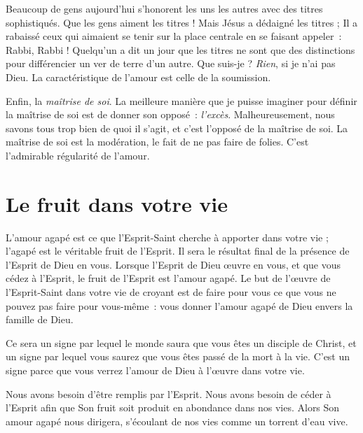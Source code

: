 Beaucoup de gens aujourd'hui s'honorent les uns les autres
 avec des titres sophistiqués. Que les gens aiment les titres !
 Mais Jésus a dédaigné les titres ; Il a rabaissé ceux qui aimaient
 se tenir sur la place centrale en se faisant appeler~:
 \og Rabbi, Rabbi ! \fg{}
 Quelqu'un a dit un jour que les titres ne sont que des distinctions
 pour différencier un ver de terre d'un autre. Que suis-je ?
 \emph{Rien}, si je n'ai pas Dieu. La caractéristique de l'amour
 est celle de la soumission.

Enfin, la \emph{maîtrise de soi}. La meilleure manière que je puisse imaginer
 pour définir la maîtrise de soi est de donner son opposé~: \emph{l'excès}.
 Malheureusement, nous savons tous trop bien de quoi il s'agit,
 et c'est l'opposé de la maîtrise de soi.
 La maîtrise de soi est la modération, le fait de ne pas faire de folies.
 C'est l'admirable régularité de l'amour.


\section*{Le fruit dans votre vie}

L'amour agapé est ce que l'Esprit-Saint cherche à apporter dans votre vie ;
 l'agapé est le véritable fruit de l'Esprit.
 Il sera le résultat final de la présence de l'Esprit de Dieu en vous.
 Lorsque l'Esprit de Dieu œuvre en vous, et que vous cédez à l'Esprit,
 le fruit de l'Esprit est l'amour agapé. Le but de l'œuvre de
 l'Esprit-Saint dans votre vie de croyant est de faire pour vous
 ce que vous ne pouvez pas faire pour vous-même~:
 vous donner l'amour agapé de Dieu envers la famille de Dieu.

Ce sera un signe par lequel le monde saura que vous êtes un disciple
 de Christ, et un signe par lequel vous saurez que vous êtes passé
 de la mort à la vie. C'est un signe parce que vous verrez
 l'amour de Dieu à l'œuvre dans votre vie.

Nous avons besoin d'être remplis par l'Esprit.
 Nous avons besoin de céder à l'Esprit afin que Son fruit soit produit
 en abondance dans nos vies. Alors Son amour agapé nous dirigera,
 s'écoulant de nos vies comme un torrent d'eau vive.
\closechapter

